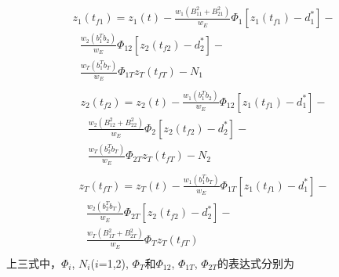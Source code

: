 \begin{equation}
\label{eq:49}
\begin{gathered}
  {z_1}({t_{f1}}) = {z_1}(t) - \frac{{{w_1}(B_{11}^2 + B_{21}^2)}}{{{w_E}}}{\Phi _1}\left[ {{z_1}({t_{f1}}) - d_1^*} \right] -  \\ 
  {\text{ }}\frac{{{w_2}\left( {b_1^T{b_2}} \right)}}{{{w_E}}}{\Phi _{12}}\left[ {{z_2}({t_{f2}}) - d_2^*} \right] -  \\ 
  {\text{ }}\frac{{{w_T}\left( {b_1^T{b_T}} \right)}}{{{w_E}}}{\Phi _{1T}}{z_T}({t_{fT}}) - {N_1} \\ 
\end{gathered}
\end{equation}
\begin{equation}
\label{eq:50}
\begin{gathered}
  {z_2}({t_{f2}}) = {z_2}(t) - \frac{{{w_1}\left( {b_1^T{b_2}} \right)}}{{{w_E}}}{\Phi _{12}}\left[ {{z_1}({t_{f1}}) - d_1^*} \right] -  \\ 
  {\text{ }}\frac{{{w_2}(B_{12}^2 + B_{22}^2)}}{{{w_E}}}{\Phi _2}\left[ {{z_2}({t_{f2}}) - d_2^*} \right] -  \\ 
  {\text{ }}\frac{{{w_T}\left( {b_2^T{b_T}} \right)}}{{{w_E}}}{\Phi _{2T}}{z_T}({t_{fT}}) - {N_2} \\ 
\end{gathered}
\end{equation}
\begin{equation}
\label{eq:51}
\begin{gathered}
  {z_T}({t_{fT}}) = {z_T}(t) - \frac{{{w_1}\left( {b_1^T{b_T}} \right)}}{{{w_E}}}{\Phi _{1T}}\left[ {{z_1}({t_{f1}}) - d_1^*} \right] -  \\ 
  {\text{ }}\frac{{{w_2}\left( {b_2^T{b_T}} \right)}}{{{w_E}}}{\Phi _{2T}}\left[ {{z_2}({t_{f2}}) - d_2^*} \right] -  \\ 
  {\text{ }}\frac{{{w_T}\left( {B_{1T}^2 + B_{2T}^2} \right)}}{{{w_E}}}{\Phi _T}{z_T}({t_{fT}}) \\ 
\end{gathered}
\end{equation}
上三式中，${\Phi _i}$, ${N_i}$($i$=1,2), ${\Phi _T}$和${\Phi _{12}}$, ${\Phi _{1T}}$, ${\Phi _{2T}}$的表达式分别为

